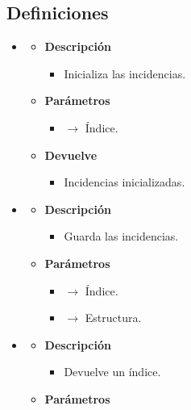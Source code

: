 \subsection{Definiciones}
\begin{itemize}
	\item {}
	\begin{itemize}
		\item \textbf{Descripción}
        \begin{itemize}
			\item Inicializa las incidencias.
		\end{itemize}
        \item \textbf{Parámetros}
		\begin{itemize}
			\item {} $\rightarrow$ Índice.
		\end{itemize}
		\item \textbf{Devuelve}
		\begin{itemize}
			\item Incidencias inicializadas.
		\end{itemize}
	\end{itemize}
    \newpage
	\item{}
	\begin{itemize}
		\item \textbf{Descripción}
        \begin{itemize}
			\item Guarda las incidencias.
		\end{itemize}
        \item \textbf{Parámetros}
		\begin{itemize}
			\item {} $\rightarrow$ Índice.
            \item {} $\rightarrow$ Estructura.
		\end{itemize}
	\end{itemize}
    \item{}
	\begin{itemize}
		\item \textbf{Descripción}
        \begin{itemize}
			\item Devuelve un índice.
		\end{itemize}
        \item \textbf{Parámetros}
		\begin{itemize}

\end{itemize}
\end{itemize}
\end{itemize}
